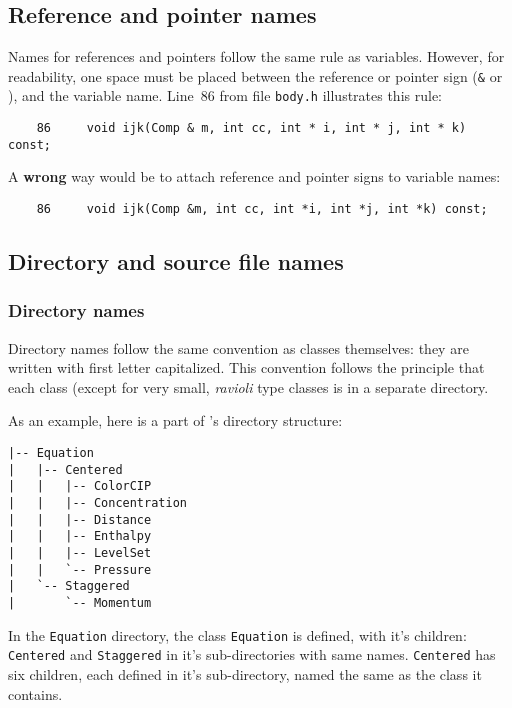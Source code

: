 \subsection{Reference and pointer names}

Names for references and pointers follow the same rule as variables.
However, for readability, one space must be placed between the
reference or pointer sign ({\tt \&} or {\tt *}), and the variable name.
Line~86 from file {\tt body.h} illustrates this rule:
%
{\small \begin{verbatim}
    86     void ijk(Comp & m, int cc, int * i, int * j, int * k) const;
\end{verbatim}}
%
A {\bf wrong} way would be to attach reference and pointer signs to variable
names: 
%
{\small \begin{verbatim}
    86     void ijk(Comp &m, int cc, int *i, int *j, int *k) const;
\end{verbatim}}
%

\clearpage
\subsection{Directory and source file names}

\subsubsection{Directory names}

Directory names follow the same convention as classes themselves: they are
written with first letter capitalized. This convention follows the principle
that each class (except for very small, {\em ravioli} type classes is in a
separate directory. 

As an example, here is a part of {\psiboil}'s directory structure:
%
{\small \begin{verbatim}
|-- Equation
|   |-- Centered
|   |   |-- ColorCIP
|   |   |-- Concentration
|   |   |-- Distance
|   |   |-- Enthalpy
|   |   |-- LevelSet
|   |   `-- Pressure
|   `-- Staggered
|       `-- Momentum
\end{verbatim}}
%
In the {\tt Equation} directory, the class {\tt Equation} is defined, with it's
children: {\tt Centered} and {\tt Staggered} in it's sub-directories with same 
names. {\tt Centered} has six children, each defined in it's sub-directory,    
named the same as the class it contains.

